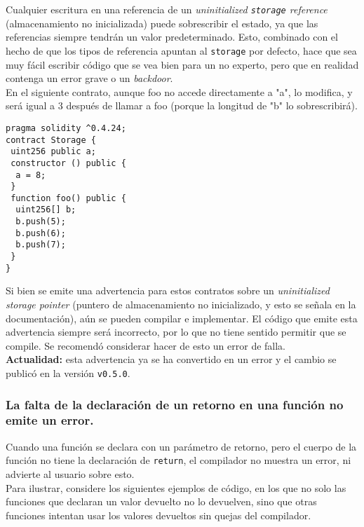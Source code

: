 Cualquier escritura en una referencia de un \textit{uninitialized \texttt{storage} reference} (almacenamiento no inicializada) puede sobrescribir el estado, ya que las referencias siempre tendrán un valor predeterminado. Esto, combinado con el hecho de que los tipos de referencia apuntan al \texttt{storage} por defecto, hace que sea muy fácil escribir código que se vea bien para un no experto, pero que en realidad contenga un error grave o un \textit{backdoor}.\\

En el siguiente contrato, aunque foo no accede directamente a "a", lo modifica, y será igual a 3 después de llamar a foo (porque la longitud de "b" lo sobrescribirá).\\

\begin{lstlisting}[language=Solidity]
pragma solidity ^0.4.24;
contract Storage {
 uint256 public a;
 constructor () public {
  a = 8;
 }
 function foo() public {
  uint256[] b;
  b.push(5);
  b.push(6);
  b.push(7);
 }
}
\end{lstlisting}

Si bien se emite una advertencia para estos contratos sobre un \textit{uninitialized storage pointer} (puntero de almacenamiento no inicializado, y esto se señala en la documentación\cite{ReadTHeDocsSolidityMemoryKeyword}), aún se pueden compilar e implementar. El código que emite esta advertencia siempre será incorrecto, por lo que no tiene sentido permitir que se compile. Se recomendó considerar hacer de esto un error de falla.\\

\textbf{Actualidad:} esta advertencia ya se ha convertido en un error y el cambio se publicó\cite{GHPR3521} en la versión \texttt{v0.5.0}.\\

\subsubsection{La falta de la declaración de un retorno en una función no emite un error.}

Cuando una función se declara con un parámetro de retorno, pero el cuerpo de la función no tiene la declaración de \texttt{return}, el compilador no muestra un error, ni advierte al usuario sobre esto.\\

Para ilustrar, considere los siguientes ejemplos de código, en los que no solo las funciones que declaran un valor devuelto no lo devuelven, sino que otras funciones intentan usar los valores devueltos sin quejas del compilador.\\

